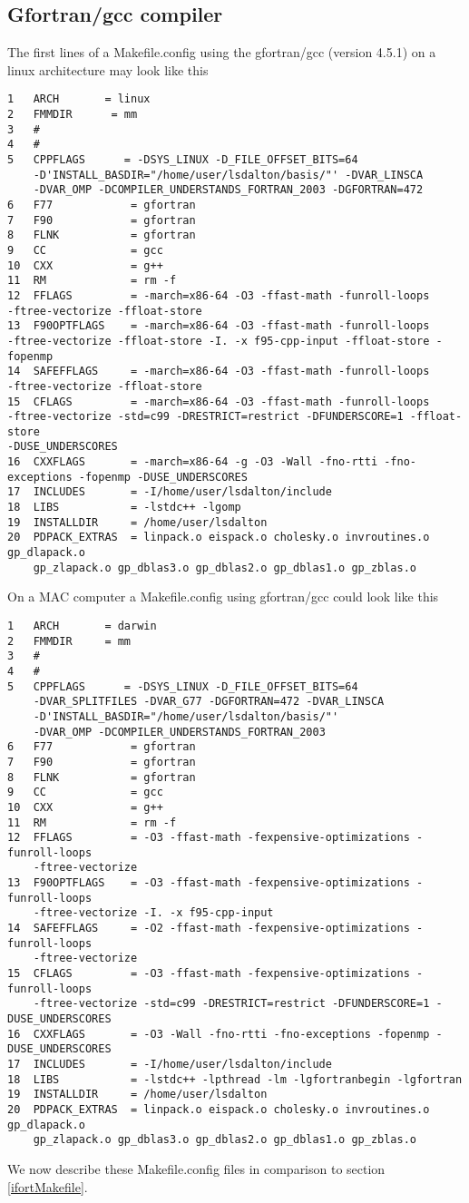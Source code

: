 \subsection{Gfortran/gcc compiler}
The first lines of a Makefile.config using the gfortran/gcc (version 4.5.1) on a linux architecture may look like this
\begin{verbatim}
1   ARCH       = linux
2   FMMDIR      = mm
3   #
4   #
5   CPPFLAGS      = -DSYS_LINUX -D_FILE_OFFSET_BITS=64
    -D'INSTALL_BASDIR="/home/user/lsdalton/basis/"' -DVAR_LINSCA
    -DVAR_OMP -DCOMPILER_UNDERSTANDS_FORTRAN_2003 -DGFORTRAN=472
6   F77            = gfortran
7   F90            = gfortran
8   FLNK           = gfortran
9   CC             = gcc
10  CXX            = g++
11  RM             = rm -f
12  FFLAGS         = -march=x86-64 -O3 -ffast-math -funroll-loops 
-ftree-vectorize -ffloat-store
13  F90OPTFLAGS    = -march=x86-64 -O3 -ffast-math -funroll-loops 
-ftree-vectorize -ffloat-store -I. -x f95-cpp-input -ffloat-store -fopenmp
14  SAFEFFLAGS     = -march=x86-64 -O3 -ffast-math -funroll-loops 
-ftree-vectorize -ffloat-store
15  CFLAGS         = -march=x86-64 -O3 -ffast-math -funroll-loops 
-ftree-vectorize -std=c99 -DRESTRICT=restrict -DFUNDERSCORE=1 -ffloat-store 
-DUSE_UNDERSCORES
16  CXXFLAGS       = -march=x86-64 -g -O3 -Wall -fno-rtti -fno-exceptions -fopenmp -DUSE_UNDERSCORES
17  INCLUDES       = -I/home/user/lsdalton/include 
18  LIBS           = -lstdc++ -lgomp 
19  INSTALLDIR     = /home/user/lsdalton
20  PDPACK_EXTRAS  = linpack.o eispack.o cholesky.o invroutines.o gp_dlapack.o 
    gp_zlapack.o gp_dblas3.o gp_dblas2.o gp_dblas1.o gp_zblas.o
\end{verbatim}
On a MAC computer a Makefile.config using gfortran/gcc could look like this
\begin{verbatim}
1   ARCH       = darwin
2   FMMDIR     = mm
3   #
4   #
5   CPPFLAGS      = -DSYS_LINUX -D_FILE_OFFSET_BITS=64 
    -DVAR_SPLITFILES -DVAR_G77 -DGFORTRAN=472 -DVAR_LINSCA
    -D'INSTALL_BASDIR="/home/user/lsdalton/basis/"' 
    -DVAR_OMP -DCOMPILER_UNDERSTANDS_FORTRAN_2003
6   F77            = gfortran
7   F90            = gfortran
8   FLNK           = gfortran
9   CC             = gcc
10  CXX            = g++
11  RM             = rm -f
12  FFLAGS         = -O3 -ffast-math -fexpensive-optimizations -funroll-loops 
    -ftree-vectorize
13  F90OPTFLAGS    = -O3 -ffast-math -fexpensive-optimizations -funroll-loops 
    -ftree-vectorize -I. -x f95-cpp-input
14  SAFEFFLAGS     = -O2 -ffast-math -fexpensive-optimizations -funroll-loops 
    -ftree-vectorize
15  CFLAGS         = -O3 -ffast-math -fexpensive-optimizations -funroll-loops 
    -ftree-vectorize -std=c99 -DRESTRICT=restrict -DFUNDERSCORE=1 -DUSE_UNDERSCORES
16  CXXFLAGS       = -O3 -Wall -fno-rtti -fno-exceptions -fopenmp -DUSE_UNDERSCORES
17  INCLUDES       = -I/home/user/lsdalton/include 
18  LIBS           = -lstdc++ -lpthread -lm -lgfortranbegin -lgfortran
19  INSTALLDIR     = /home/user/lsdalton
20  PDPACK_EXTRAS  = linpack.o eispack.o cholesky.o invroutines.o gp_dlapack.o 
    gp_zlapack.o gp_dblas3.o gp_dblas2.o gp_dblas1.o gp_zblas.o
\end{verbatim}
We now describe these Makefile.config files in comparison to section \ref{ifortMakefile}.

